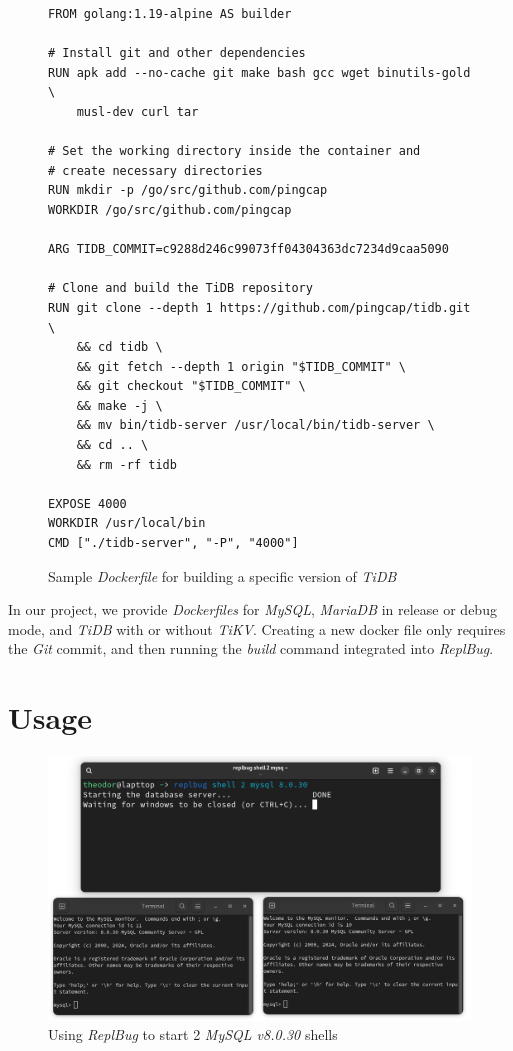 \begin{figure}
\begin{verbatim}
FROM golang:1.19-alpine AS builder

# Install git and other dependencies
RUN apk add --no-cache git make bash gcc wget binutils-gold \
    musl-dev curl tar

# Set the working directory inside the container and
# create necessary directories
RUN mkdir -p /go/src/github.com/pingcap
WORKDIR /go/src/github.com/pingcap

ARG TIDB_COMMIT=c9288d246c99073ff04304363dc7234d9caa5090

# Clone and build the TiDB repository
RUN git clone --depth 1 https://github.com/pingcap/tidb.git \
    && cd tidb \
    && git fetch --depth 1 origin "$TIDB_COMMIT" \
    && git checkout "$TIDB_COMMIT" \
    && make -j \
    && mv bin/tidb-server /usr/local/bin/tidb-server \
    && cd .. \
    && rm -rf tidb

EXPOSE 4000
WORKDIR /usr/local/bin
CMD ["./tidb-server", "-P", "4000"]    
\end{verbatim}
\caption{Sample \textit{Dockerfile} for building a specific version of \textit{TiDB}}
\label{fig:dockerfilesample}
\end{figure}

In our project, we provide \textit{Dockerfiles} for \textit{MySQL}, \textit{MariaDB} in release or debug mode, and \textit{TiDB} with or without \textit{TiKV}. Creating a new docker file only requires the \textit{Git} commit, and then running the \textit{build} command integrated into \textit{ReplBug}. 

\section{Usage}



\begin{figure}
    \centering
    \includegraphics[width=\linewidth]{assets/replbug_shell.png}
    \caption{Using \textit{ReplBug} to start 2 \textit{MySQL v8.0.30} shells}
    \label{fig:replb_shell}
\end{figure}

